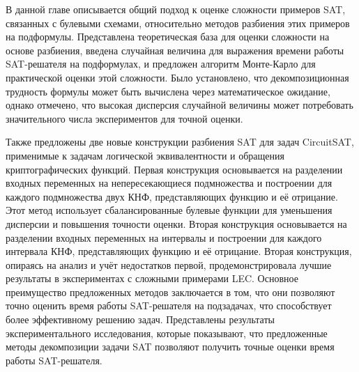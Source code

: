 \chapterconclusion

В данной главе описывается общий подход к оценке сложности примеров SAT, связанных с булевыми схемами, относительно методов разбиения этих примеров на подформулы.
Представлена теоретическая база для оценки сложности на основе разбиения, введена случайная величина для выражения времени работы SAT-решателя на подформулах, и предложен алгоритм Монте-Карло для практической оценки этой сложности.
Было установлено, что декомпозиционная трудность формулы может быть вычислена через математическое ожидание, однако отмечено, что высокая дисперсия случайной величины может потребовать значительного числа экспериментов для точной оценки.

Также предложены две новые конструкции разбиения SAT для задач CircuitSAT, применимые к задачам логической эквивалентности и обращения криптографических функций.
Первая конструкция основывается на разделении входных переменных на непересекающиеся подмножества и построении для каждого подмножества двух КНФ, представляющих функцию и её отрицание.
Этот метод использует сбалансированные булевые функции для уменьшения дисперсии и повышения точности оценки.
Вторая конструкция основывается на разделении входных переменных на интервалы и построении для каждого интервала КНФ, представляющих функцию и её отрицание.
Вторая конструкция, опираясь на анализ и учёт недостатков первой, продемонстрировала лучшие результаты в экспериментах с сложными примерами LEC.
Основное преимущество предложенных методов заключается в том, что они позволяют точно оценить время работы SAT-решателя на подзадачах, что способствует более эффективному решению задач.
Представлены результаты экспериментального исследования, которые показывают, что предложенные методы декомпозиции задачи SAT позволяют получить точные оценки время работы SAT-решателя.
